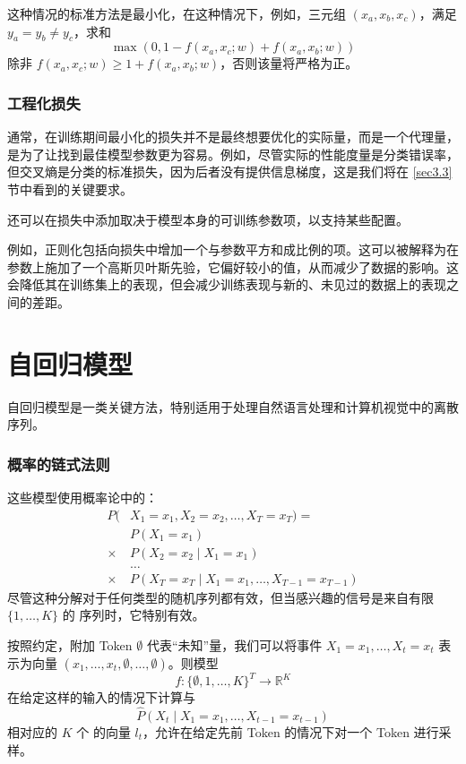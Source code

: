 这种情况的标准方法是最小化，在这种情况下，例如，三元组 $(x_a,x_b,x_c)$，满足 $y_a = y_b \ne y_c$，求和
\[\max(0,1-f(x_a,x_c;w)+f(x_a,x_b;w))\]
除非 $f(x_a,x_c;w) \ge 1+f(x_a,x_b;w)$，否则该量将严格为正。

\subsubsection*{工程化损失}

通常，在训练期间最小化的损失并不是最终想要优化的实际量，而是一个代理量，是为了让找到最佳模型参数更为容易。例如，尽管实际的性能度量是分类错误率，但交叉熵是分类的标准损失，因为后者没有提供信息梯度，这是我们将在 \ref{sec3.3} 节中看到的关键要求。

还可以在损失中添加取决于模型本身的可训练参数项，以支持某些配置。

例如，正则化包括向损失中增加一个与参数平方和成比例的项。这可以被解释为在参数上施加了一个高斯贝叶斯先验，它偏好较小的值，从而减少了数据的影响。这会降低其在训练集上的表现，但会减少训练表现与新的、未见过的数据上的表现之间的差距。

\section{自回归模型}

自回归模型是一类关键方法，特别适用于处理自然语言处理和计算机视觉中的离散序列。

\subsubsection*{概率的链式法则}

这些模型使用概率论中的：
\begin{align*}
    P(&X_1 = x_1,X_2 = x_2,\dots,X_T = x_T) = \\
    &P(X_1 = x_1) \\
    \times &P(X_2 = x_2 \mid X_1 = x_1) \\
    &\dots \\
    \times &P(X_T = x_T \mid X_1 = x_1,\dots,X_{T-1} = x_{T-1})
\end{align*}
尽管这种分解对于任何类型的随机序列都有效，但当感兴趣的信号是来自有限 $\{1, \dots ,K\}$ 的  序列时，它特别有效。

按照约定，附加 Token $\emptyset$ 代表``未知''量，我们可以将事件 ${X_1 = x_1,\dots,X_t = x_t}$ 表示为向量 $(x_1,\dots,x_t,\emptyset,\dots,\emptyset)$。则模型
\[f : \{\emptyset,1,\dots,K\}^T \to \mathbb{R}^K\]
在给定这样的输入的情况下计算与
\[\hat{P}(X_t \mid X_1 = x_1,\dots,X_{t-1} = x_{t-1})\]
相对应的 $K$ 个  的向量 $l_t$，允许在给定先前 Token 的情况下对一个 Token 进行采样。

